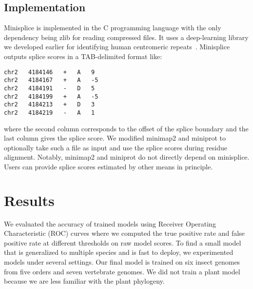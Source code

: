 \documentclass[webpdf,contemporary,large,namedate]{oup-authoring-template}%
\begin{document}
\subsection{Implementation}

Minisplice is implemented in the C programming language with the only dependency
being zlib for reading compressed files.
It uses a deep-learning library we developed earlier for identifying human centromeric repeats~\citep{Li:2019aa}.
Minisplice outputs splice scores in a TAB-delimited format like:
\begin{verbatim}
chr2   4184146   +   A   9
chr2   4184167   +   A   -5
chr2   4184191   -   D   5
chr2   4184199   +   A   -5
chr2   4184213   +   D   3
chr2   4184219   -   A   1
\end{verbatim}
where the second column corresponds to the offset of the splice boundary
and the last column gives the splice score.
We modified minimap2 and miniprot to optionally take such a file as input
and use the splice scores during residue alignment.
Notably, minimap2 and miniprot do not directly depend on minisplice.
Users can provide splice scores estimated by other means in principle.

\section{Results}

We evaluated the accuracy of trained models using Receiver Operating Characteristic (ROC) curves
where we computed the true positive rate and false positive rate at different thresholds on raw model scores.
To find a small model that is generalized to multiple species and is fast to deploy,
we experimented models under several settings.
Our final model is trained on six insect genomes from five orders and seven vertebrate genomes.
We did not train a plant model because we are less familiar with the plant phylogeny.
\end{document}
